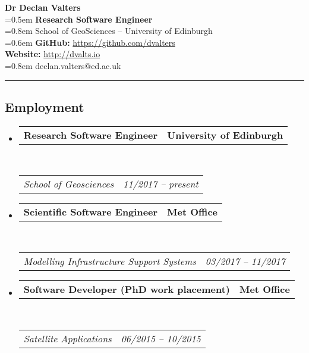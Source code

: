 \documentclass[10.5pt,a4]{article}
\makeatletter
\newcommand{\headerrow}[2]
{\begin{tabular*}{\linewidth}{l@{\extracolsep{\fill}}r}
	#1 &
	#2 \\
\end{tabular*}}
\makeatother
\begin{document}
\begin{flushleft}
{\LARGE \textbf{Dr Declan Valters}} \\
\parskip=0.5em
{\textbf{\large{Research Software Engineer}} \\ 
\parskip=0.8em
School of GeoSciences -- University of Edinburgh} \\
\parskip=0.6em
\textbf{GitHub:} \url{https://github.com/dvalters} \\ 
\textbf{Website:} \url{http://dvalts.io} \\
\parskip=0.8em 
declan.valters@ed.ac.uk
\end{flushleft}



\hrule
\vspace{-0.4em}


\subsection*{Employment}
\begin{itemize}
	\parskip=0.1em

	\item
	\headerrow
		{\textbf{Research Software Engineer}}
		{\textbf{University of Edinburgh}}
	\\
	\headerrow
		{\emph{School of Geosciences}}
		{\emph{11/2017 -- present}}

	\item
	\headerrow
		{\textbf{Scientific Software Engineer}}
		{\textbf{Met Office}}
	\\
	\headerrow
		{\emph{Modelling Infrastructure Support Systems}}
		{\emph{03/2017 -- 11/2017}}

	\item
	\headerrow
		{\textbf{Software Developer (PhD work placement)}}
		{\textbf{Met Office}}
	\\
	\headerrow
		{\emph{Satellite Applications}}
		{\emph{06/2015 -- 10/2015}}

\end{itemize}
\end{document}
